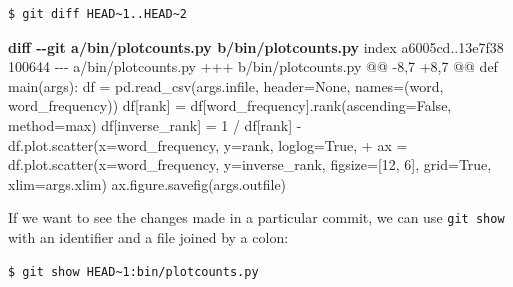 \documentclass[
]{krantz}
\makeatletter
\newenvironment{Shaded}{\begin{snugshade}}{\end{snugshade}}
\newcommand{\DataTypeTok}[1]{\textcolor[rgb]{0.13,0.29,0.53}{#1}}
\newcommand{\KeywordTok}[1]{\textcolor[rgb]{0.13,0.29,0.53}{\textbf{#1}}}
\newcommand{\NormalTok}[1]{#1}
\newcommand{\StringTok}[1]{\textcolor[rgb]{0.31,0.60,0.02}{#1}}
\newcommand{\VariableTok}[1]{\textcolor[rgb]{0.00,0.00,0.00}{#1}}
\newenvironment{kframe}{%
\medskip{}
\setlength{\fboxsep}{.8em}
 \def\at@end@of@kframe{}%
 \ifinner\ifhmode%
  \def\at@end@of@kframe{\end{minipage}}%
  \begin{minipage}{\columnwidth}%
 \fi\fi%
 \def\FrameCommand##1{\hskip\@totalleftmargin \hskip-\fboxsep
 \colorbox{shadecolor}{##1}\hskip-\fboxsep
     \hskip-\linewidth \hskip-\@totalleftmargin \hskip\columnwidth}%
 \MakeFramed {\advance\hsize-\width
   \@totalleftmargin\z@ \linewidth\hsize
   \@setminipage}}%
 {\par\unskip\endMakeFramed%
 \at@end@of@kframe}
\renewenvironment{Shaded}{\begin{kframe}}{\end{kframe}}
\makeatother
\begin{document}
\begin{verbatim}
$ git diff HEAD~1..HEAD~2
\end{verbatim}

\begin{Shaded}
\begin{Highlighting}[]
\KeywordTok{diff {-}{-}git a/bin/plotcounts.py b/bin/plotcounts.py}
\NormalTok{index a6005cd..13e7f38 100644}
\DataTypeTok{{-}{-}{-} a/bin/plotcounts.py}
\DataTypeTok{+++ b/bin/plotcounts.py}
\DataTypeTok{@@ {-}8,7 +8,7 @@ def main(args):}
\NormalTok{     df = pd.read\_csv(args.infile, header=None, names=(\textquotesingle{}word\textquotesingle{}, \textquotesingle{}word\_frequency\textquotesingle{}))}
\NormalTok{     df[\textquotesingle{}rank\textquotesingle{}] = df[\textquotesingle{}word\_frequency\textquotesingle{}].rank(ascending=False, method=\textquotesingle{}max\textquotesingle{})}
\NormalTok{     df[\textquotesingle{}inverse\_rank\textquotesingle{}] = 1 / df[\textquotesingle{}rank\textquotesingle{}]}
\StringTok{{-}    df.plot.scatter(x=\textquotesingle{}word\_frequency\textquotesingle{}, y=\textquotesingle{}rank\textquotesingle{}, loglog=True,}
\VariableTok{+    ax = df.plot.scatter(x=\textquotesingle{}word\_frequency\textquotesingle{}, y=\textquotesingle{}inverse\_rank\textquotesingle{},}
\NormalTok{                          figsize=[12, 6], grid=True, xlim=args.xlim)}
\NormalTok{     ax.figure.savefig(args.outfile)}
\end{Highlighting}
\end{Shaded}

If we want to see the changes made in a particular commit,
we can use \texttt{git\ show}
with an identifier and a file joined by a colon:

\begin{verbatim}
$ git show HEAD~1:bin/plotcounts.py
\end{verbatim}
\end{document}
